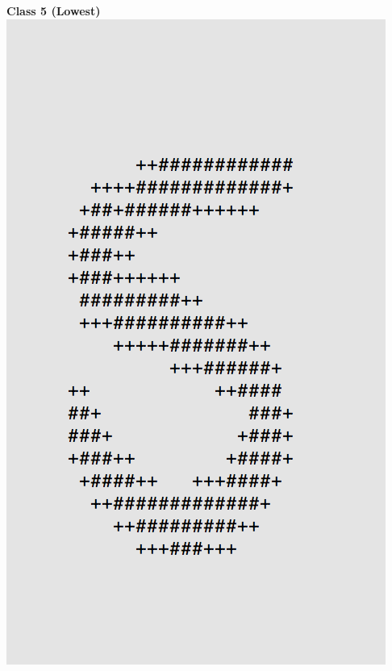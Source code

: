 \documentclass[11pt]{article}
\begin{document}
\begin{center}
\begin{multicols}{2}
\textbf{Class 5 (Lowest)}\\
\includegraphics[scale=0.4]{part1/1/low_5.png}
\end{multicols}
\end{center}
\end{document}

